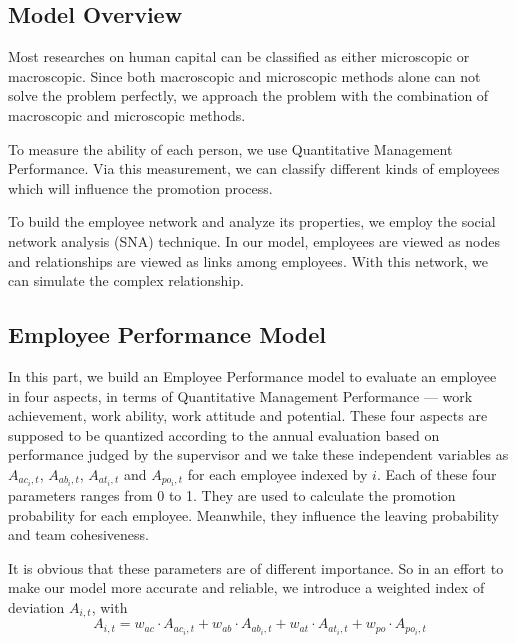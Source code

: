 \documentclass[12pt,a4paper,titlepage]{article}
\begin{document}
\subsection{Model Overview}
\label{sec:model-overview}

Most researches on human capital can be classified as either
microscopic or macroscopic. Since both macroscopic and microscopic
methods alone can not solve the problem perfectly, we approach the
problem with the combination of macroscopic and microscopic methods.

To measure the ability of each person, we use Quantitative Management
Performance. Via this measurement, we can classify different kinds of
employees which will influence the promotion process.

To build the employee network and analyze its properties, we employ
the social network analysis (SNA) technique. In our model,
 employees are viewed as nodes and relationships are viewed as links 
 among employees. With this network, we can simulate the complex relationship.



\subsection{Employee Performance Model}
\label{sec:human-model}

In this part, we build an Employee Performance model to evaluate an employee in four
aspects, in terms of Quantitative Management Performance ---
work achievement, work ability, work attitude and potential\cite{3}. These
four aspects are supposed to be quantized according to the annual
evaluation based on performance judged by the supervisor and we
take these independent variables as $A_{ac_i,t}$, $A_{ab_i,t}$, $A_{at_i,t}$
and $A_{po_i,t}$ for each employee indexed by $i$. Each of these four parameters ranges from 0 to 1. They are used to calculate the
promotion probability for each employee. Meanwhile, they influence the
leaving probability and team cohesiveness.

It is obvious that these parameters are of different importance. So in an effort to make our model more accurate and reliable, we introduce a weighted index of deviation $A_{i,t}$, with
\begin{equation}
  A_{i,t}=w_{ac} \cdot A_{ac_i,t} + w_{ab} \cdot A_{ab_i,t} + w_{at} \cdot A_{at_i,t} +
  w_{po} \cdot A_{po_i,t}
\end{equation}
\end{document}
